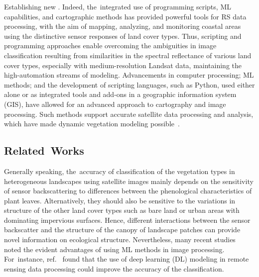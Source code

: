 \documentclass[coasts,article,accept,pdftex,oneauthor]{Definitions/mdpi}
\begin{document}
Establishing new . Indeed, the~integrated use of{ }programming scripts, ML capabilities, and cartographic methods {has} provided powerful tools for RS data processing, with the aim of mapping, analyzing, and monitoring coastal areas using {the} distinctive sensor responses of land cover types. {Thus, {scripting} and programming {approaches enable overcoming} the ambiguities in image classification resulting from similarities {in the} spectral reflectance {of} various land cover types, especially with{ }medium-resolution Landsat data{, maintaining} the {high-automation} streams of {modeling}.} Advancements in computer processing; ML methods; and the development of scripting languages, such as Python, used either {alone} or {as }integrated {tools and add-ons }in a geographic information system (GIS), have allowed for an advanced {approach to} cartography and image processing. Such methods support accurate satellite data processing and analysis, which have {made} dynamic vegetation modeling possible~\cite{Lemenkova202227}. 

\subsection{Related~Works}
Generally speaking, the~accuracy of classification of {the} vegetation types in heterogeneous landscapes using satellite images {mainly depends} on {the} sensitivity of sensor backscattering to{ }{differences} between the phenological characteristics of plant leaves{. Alternatively, they should also be sensitive to the variations in} structure of {the} other land cover types{ }such as bare land or urban areas with dominating impervious surfaces{. Hence, }different {interactions} between the sensor backscatter and the structure of the canopy of landscape patches {can provide {novel} information on ecological structure}. Nevertheless, many recent studies~\cite{rs15235559,WU2023103407,CHEN2023101499,rs15225387,LIN2021102370}{ }noted the evident advantages of using {ML} methods in image processing. For~instance, ref.~\cite{LIAO2023110231} found that the use of deep learning (DL) modeling in remote sensing data processing could improve {the accuracy of the }classification. 
\end{document}
